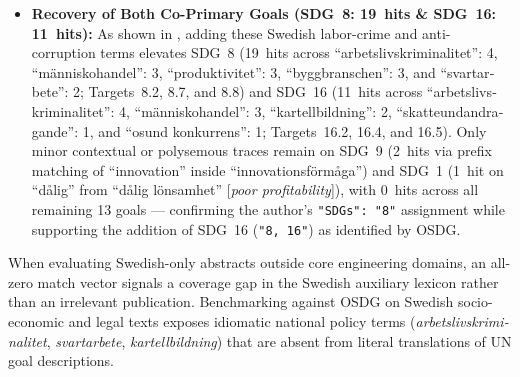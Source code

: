 \begin{casestudySection}
\begin{itemize}
    \item \textbf{Recovery of Both Co-Primary Goals (\gls{SDG}~8: \num{19}~hits \& \gls{SDG}~16: \num{11}~hits):} As shown in , adding these Swedish labor-crime and anti-corruption terms elevates \gls{SDG}~8 (\num{19}~hits across \enquote{\foreignlanguage{swedish}{arbetslivskriminalitet}}: 4, \enquote{\foreignlanguage{swedish}{människohandel}}: 3, \enquote{\foreignlanguage{swedish}{produktivitet}}: 3, \enquote{\foreignlanguage{swedish}{byggbranschen}}: 3, and \enquote{\foreignlanguage{swedish}{svartarbete}}: 2; Targets~8.2, 8.7, and 8.8) and \gls{SDG}~16 (\num{11}~hits across \enquote{\foreignlanguage{swedish}{arbetslivskriminalitet}}: 4, \enquote{\foreignlanguage{swedish}{människohandel}}: 3, \enquote{\foreignlanguage{swedish}{kartellbildning}}: 2, \enquote{\foreignlanguage{swedish}{skatteundandragande}}: 1, and \enquote{\foreignlanguage{swedish}{osund konkurrens}}: 1; Targets~16.2, 16.4, and 16.5). Only minor contextual or polysemous traces remain on \gls{SDG}~9 (\num{2}~hits via prefix matching of \enquote{innovation} inside \enquote{\foreignlanguage{swedish}{innovationsförmåga}}) and \gls{SDG}~1 (\num{1}~hit on \enquote{\foreignlanguage{swedish}{dålig}} from \enquote{\foreignlanguage{swedish}{dålig lönsamhet}} [\emph{poor profitability}]), with \num{0}~hits across all remaining \num{13} goals --- confirming the author's \texttt{"SDGs": "8"} assignment while supporting the addition of \gls{SDG}~16 (\texttt{"8, 16"}) as identified by OSDG.
\end{itemize}
\end{casestudySection}

\begin{takeaway}
When evaluating Swedish-only abstracts outside core engineering domains, an all-zero match vector signals a coverage gap in the Swedish auxiliary lexicon rather than an irrelevant publication. Benchmarking against OSDG on Swedish socio-economic and legal texts exposes idiomatic national policy terms (\eg \emph{\foreignlanguage{swedish}{arbetslivskriminalitet}}, \emph{\foreignlanguage{swedish}{svartarbete}}, \emph{\foreignlanguage{swedish}{kartellbildning}}) that are absent from literal translations of \gls{UN} goal descriptions.
\end{takeaway}

